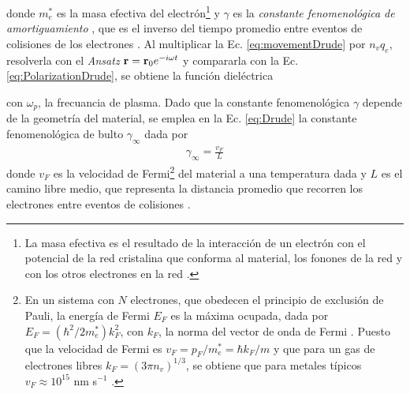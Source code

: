 donde $m_e^*$ es la masa efectiva del electrón\footnote{La masa efectiva es el resultado de la interacción de un electrón con el potencial de la red cristalina que conforma al material, los fonones de la red y con los otros electrones en la red \cite{gross2014festkorperphysik}. } \cite{gross2014festkorperphysik} y $\gamma$ es la \emph{constante fenomenológica de amortiguamiento} \cite{kreibig1995clusters}, que es el inverso del tiempo promedio entre eventos de colisiones  de los electrones \cite{novotny2006principles,gross2014festkorperphysik}.  Al multiplicar la Ec.  \eqref{eq:movementDrude} por $n_v q_e$, resolverla con el \emph{Ansatz} $\vb{r} = \vb{r}_0e^{-i\omega t}$ y compararla con la Ec.  \eqref{eq:PolarizationDrude}, se obtiene la función dieléctrica \cite{novotny2006principles,gross2014festkorperphysik}  \vspace*{-.5em}
	\begin{tcolorbox}[title = Modelo de Drude-Sommerfeld, breakable ]
	\end{tcolorbox}\vspace*{-.5em}\noindent
con $\omega_p$, la frecuancia de plasma. Dado que la constante fenomenológica $\gamma$ depende de la geometría del material, se emplea en la Ec. \eqref{eq:Drude} la constante fenomenológica de bulto $\gamma_\infty$ dada por \cite{kreibig1995clusters}
	\begin{align}
	\gamma_\infty = \frac{v_F}{L}
			 \label{eq:gammaInf}	
	\end{align}
donde $v_F$ es la velocidad de Fermi\footnote{En un sistema con $N$ electrones, que obedecen el principio  de exclusión de Pauli, la energía de Fermi $E_F$ es la máxima ocupada, dada por $E_F = (\hbar^2/2m_e^*)k_F^2$, con $k_F$, la norma del vector de onda de Fermi \cite{gross2014festkorperphysik}.  Puesto que la velocidad de Fermi es $v_F = p_F/m_e^* = \hbar k_F / m$ y que para un gas de electrones libres $k_F=(3\pi n_v)^{1/3}$, se obtiene que para metales típicos $v_F\approx 10^{15}$ nm s$^{-1}$ \cite{gross2014festkorperphysik}. } del material a una temperatura dada y $L$ es el camino libre medio, que representa la distancia promedio que recorren los electrones entre eventos de colisiones \cite{gross2014festkorperphysik}.  


